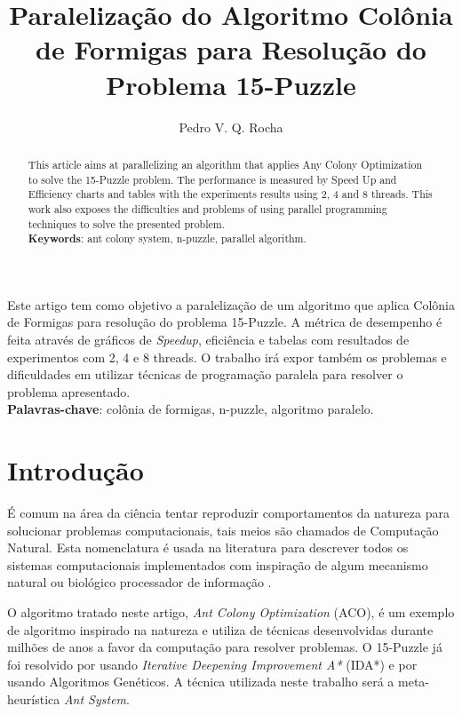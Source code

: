 \documentclass[12pt]{article}
\title{Paraleliza\c{c}\~ao do Algoritmo Col\^onia de Formigas para Resolu\c{c}\~ao do Problema 15-Puzzle}
\author{Pedro V. Q. Rocha}
\begin{document}
 

\maketitle

\begin{resumo}
  Este artigo tem como objetivo a paralelização de um algoritmo que aplica Colônia de Formigas para resolução do problema 15-Puzzle. A métrica de desempenho é feita através de gráficos de \textit{Speedup}, eficiência e tabelas com resultados de experimentos com 2, 4 e 8 threads. O trabalho irá expor também os problemas e dificuldades em utilizar técnicas de programação paralela para resolver o problema apresentado. \\
  \textbf{Palavras-chave}: col\^onia de formigas, n-puzzle, algoritmo paralelo.
\end{resumo}

\begin{abstract} 
  This article aims at parallelizing an algorithm that applies Any Colony Optimization to solve the 15-Puzzle problem. The performance is measured by Speed Up and Efficiency charts and tables with the experiments results using 2, 4 and 8 threads. This work also exposes the difficulties and problems of using parallel programming techniques to solve the presented problem. \\
  \textbf{Keywords}: ant colony system, n-puzzle, parallel algorithm.
\end{abstract}

\section{Introdução}
\'E comum na área da ci\^encia tentar reproduzir comportamentos da natureza para solucionar problemas computacionais, tais meios s\~ao chamados de Computa\c{c}\~ao Natural. Esta nomenclatura \'e usada na literatura para descrever todos os sistemas computacionais implementados com inspira\c{c}\~ao de algum mecanismo natural ou biol\'ogico processador de informa\c{c}\~ao \cite{decastro}.

O algoritmo tratado neste artigo, \textit{Ant Colony Optimization} (ACO), \'e um exemplo de algoritmo inspirado na natureza e utiliza de t\'ecnicas desenvolvidas durante milh\~oes de anos a favor da computa\c{c}\~ao para resolver problemas. O 15-Puzzle já foi resolvido por \cite{Culberson94efficientlysearching} usando \textit{Iterative Deepening Improvement A*} (IDA*) e por \cite{harshgenetic} usando Algoritmos Genéticos. A técnica utilizada neste trabalho será a meta-heurística \textit{Ant System}.
\end{document}
